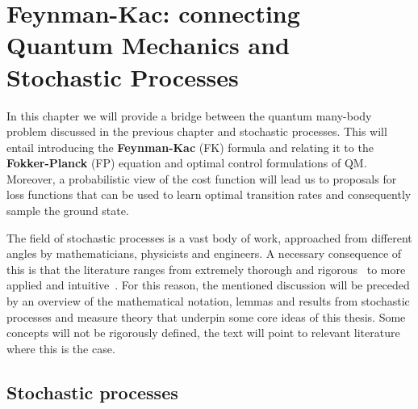 
\ifpdf
\graphicspath{{Chapter3/Figs/Raster/}{Chapter3/Figs/PDF/}{Chapter3/Figs/}}
\else
\graphicspath{{Chapter3/Figs/Vector/}{Chapter3/Figs/}}
\fi


\newtheorem{theorem}{Theorem}[section]
\newtheorem{corollary}{Corollary}[theorem]
\newtheorem{lemma}[theorem]{Lemma}
\newtheorem{definition}{Definition}[section]

\chapter{Feynman-Kac: connecting Quantum Mechanics and Stochastic Processes}
\label{chapter3}
In this chapter we will provide a bridge between the quantum many-body problem discussed in the previous chapter and stochastic processes. This will entail introducing the \textbf{Feynman-Kac} (FK) formula and relating it to the \textbf{Fokker-Planck} (FP) equation and optimal control formulations of QM. Moreover, a probabilistic view of the cost function will lead us to proposals for loss functions that can be used to learn optimal transition rates and consequently sample the ground state.

The field of stochastic processes is a vast body of work, approached from different angles by mathematicians, physicists and engineers. A necessary consequence of this is that the literature ranges from extremely thorough and rigorous~\cite{rogers1994diffusions, rogers2000diffusions} to more applied and intuitive~\cite{sarkka2019applied}. For this reason, the mentioned discussion will be preceded by an overview of the mathematical notation, lemmas and results from stochastic processes and measure theory that underpin some core ideas of this thesis. Some concepts will not be rigorously defined, the text will point to relevant literature where this is the case.

\section{Stochastic processes}
\label{subsec:fk-stoch}
